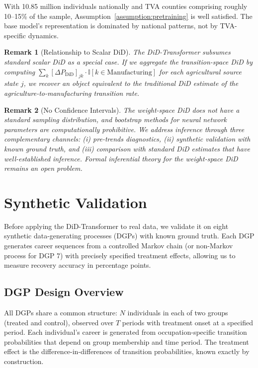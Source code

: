 \documentclass[12pt]{article}
\newcommand{\ind}{\mathbb{I}}
\newtheorem{remark}{Remark}
\begin{document}
With 10.85 million individuals nationally and TVA counties comprising roughly 10--15\% of the sample, Assumption~\ref{assumption:pretraining} is well satisfied. The base model's representation is dominated by national patterns, not by TVA-specific dynamics.

\begin{remark}[Relationship to Scalar DiD]
The DiD-Transformer subsumes standard scalar DiD as a special case. If we aggregate the transition-space DiD by computing $\sum_k [\Delta P_{\text{DiD}}]_{jk} \cdot \ind[k \in \text{Manufacturing}]$ for each agricultural source state $j$, we recover an object equivalent to the traditional DiD estimate of the agriculture-to-manufacturing transition rate.
\end{remark}

\begin{remark}[No Confidence Intervals]
The weight-space DiD does not have a standard sampling distribution, and bootstrap methods for neural network parameters are computationally prohibitive. We address inference through three complementary channels: (i) pre-trends diagnostics, (ii) synthetic validation with known ground truth, and (iii) comparison with standard DiD estimates that have well-established inference. Formal inferential theory for the weight-space DiD remains an open problem.
\end{remark}


\section{Synthetic Validation}\label{sec:synthetic}

Before applying the DiD-Transformer to real data, we validate it on eight synthetic data-generating processes (DGPs) with known ground truth. Each DGP generates career sequences from a controlled Markov chain (or non-Markov process for DGP 7) with precisely specified treatment effects, allowing us to measure recovery accuracy in percentage points.

\subsection{DGP Design Overview}

All DGPs share a common structure: $N$ individuals in each of two groups (treated and control), observed over $T$ periods with treatment onset at a specified period. Each individual's career is generated from occupation-specific transition probabilities that depend on group membership and time period. The treatment effect is the difference-in-differences of transition probabilities, known exactly by construction.
\end{document}
